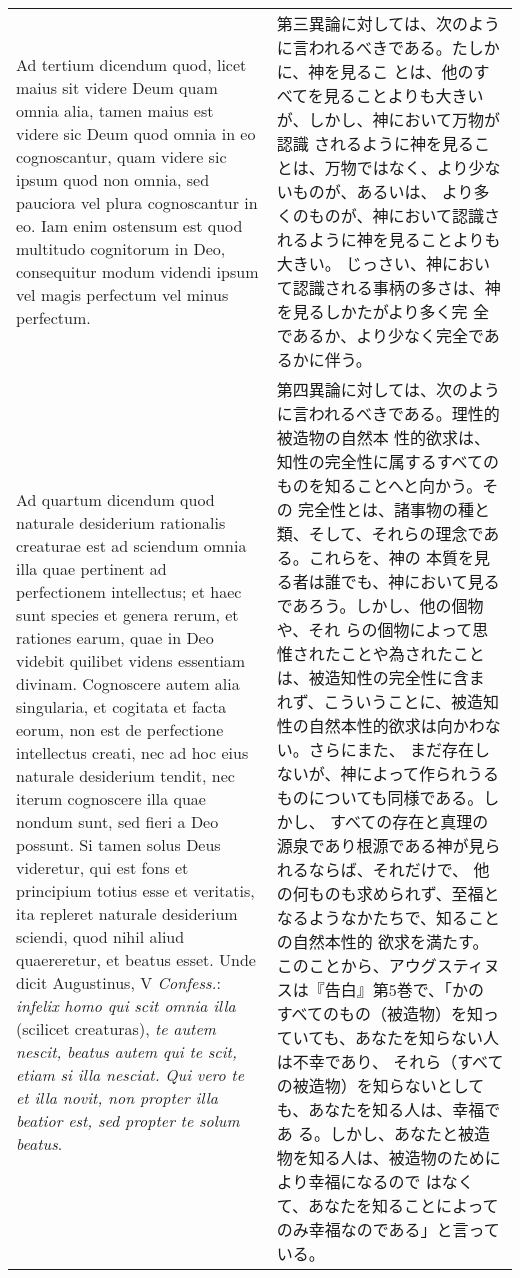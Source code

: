 \documentclass[10pt]{jsarticle} %
\begin{document}
\begin{longtable}{p{21em}p{21em}}
{\sc  Ad tertium dicendum} quod, licet maius sit videre Deum quam
 omnia alia, tamen maius est videre sic Deum quod omnia in eo
 cognoscantur, quam videre sic ipsum quod non omnia, sed pauciora vel
 plura cognoscantur in eo. Iam enim ostensum est quod multitudo
 cognitorum in Deo, consequitur modum videndi ipsum vel magis perfectum
 vel minus perfectum.

&

第三異論に対しては、次のように言われるべきである。たしかに、神を見るこ
とは、他のすべてを見ることよりも大きいが、しかし、神において万物が認識
されるように神を見ることは、万物ではなく、より少ないものが、あるいは、
より多くのものが、神において認識されるように神を見ることよりも大きい。
じっさい、神において認識される事柄の多さは、神を見るしかたがより多く完
全であるか、より少なく完全であるかに伴う。

\\

{\sc Ad quartum dicendum} quod naturale desiderium rationalis
creaturae est ad sciendum omnia illa quae pertinent ad perfectionem
intellectus; et haec sunt species et genera rerum, et rationes earum,
quae in Deo videbit quilibet videns essentiam divinam. Cognoscere
autem alia singularia, et cogitata et facta eorum, non est de
perfectione intellectus creati, nec ad hoc eius naturale desiderium
tendit, nec iterum cognoscere illa quae nondum sunt, sed fieri a Deo
possunt. Si tamen solus Deus videretur, qui est fons et principium
totius esse et veritatis, ita repleret naturale desiderium sciendi,
quod nihil aliud quaereretur, et beatus esset. Unde dicit Augustinus,
V {\it Confess.}: {\it infelix homo qui scit omnia illa} (scilicet
creaturas), {\it te autem nescit, beatus autem qui te scit, etiam si
illa nesciat. Qui vero te et illa novit, non propter illa beatior est,
sed propter te solum beatus}.

&

第四異論に対しては、次のように言われるべきである。理性的被造物の自然本
性的欲求は、知性の完全性に属するすべてのものを知ることへと向かう。その
完全性とは、諸事物の種と類、そして、それらの理念である。これらを、神の
本質を見る者は誰でも、神において見るであろう。しかし、他の個物や、それ
らの個物によって思惟されたことや為されたことは、被造知性の完全性に含ま
れず、こういうことに、被造知性の自然本性的欲求は向かわない。さらにまた、
まだ存在しないが、神によって作られうるものについても同様である。しかし、
すべての存在と真理の源泉であり根源である神が見られるならば、それだけで、
他の何ものも求められず、至福となるようなかたちで、知ることの自然本性的
欲求を満たす。このことから、アウグスティヌスは『告白』第5巻で、「かの
すべてのもの（被造物）を知っていても、あなたを知らない人は不幸であり、
それら（すべての被造物）を知らないとしても、あなたを知る人は、幸福であ
る。しかし、あなたと被造物を知る人は、被造物のためにより幸福になるので
はなくて、あなたを知ることによってのみ幸福なのである」と言っている。

\end{longtable}
\newpage
\end{document}
